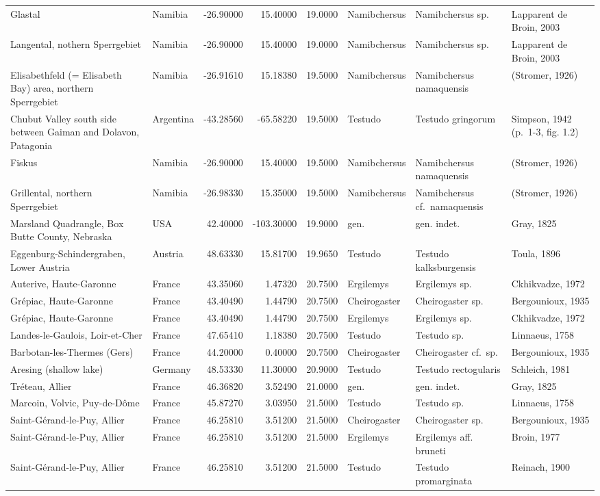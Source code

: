 \documentclass[]{article}
\begin{document}
\begin{longtable}[]{@{}llrrrlll@{}}
Glastal & Namibia & -26.90000 & 15.40000 & 19.0000 & Namibchersus &
Namibchersus sp. & Lapparent de Broin, 2003\tabularnewline
Langental, nothern Sperrgebiet & Namibia & -26.90000 & 15.40000 &
19.0000 & Namibchersus & Namibchersus sp. & Lapparent de Broin,
2003\tabularnewline
Elisabethfeld (= Elisabeth Bay) area, northern Sperrgebiet & Namibia &
-26.91610 & 15.18380 & 19.5000 & Namibchersus & Namibchersus namaquensis
& (Stromer, 1926)\tabularnewline
Chubut Valley south side between Gaiman and Dolavon, Patagonia &
Argentina & -43.28560 & -65.58220 & 19.5000 & Testudo & Testudo
gringorum & Simpson, 1942 (p.~1-3, fig. 1.2)\tabularnewline
Fiskus & Namibia & -26.90000 & 15.40000 & 19.5000 & Namibchersus &
Namibchersus namaquensis & (Stromer, 1926)\tabularnewline
Grillental, northern Sperrgebiet & Namibia & -26.98330 & 15.35000 &
19.5000 & Namibchersus & Namibchersus cf.~namaquensis & (Stromer,
1926)\tabularnewline
Marsland Quadrangle, Box Butte County, Nebraska & USA & 42.40000 &
-103.30000 & 19.9000 & gen. & gen. indet. & Gray, 1825\tabularnewline
Eggenburg-Schindergraben, Lower Austria & Austria & 48.63330 & 15.81700
& 19.9650 & Testudo & Testudo kalksburgensis & Toula,
1896\tabularnewline
Auterive, Haute-Garonne & France & 43.35060 & 1.47320 & 20.7500 &
Ergilemys & Ergilemys sp. & Ckhikvadze, 1972\tabularnewline
Grépiac, Haute-Garonne & France & 43.40490 & 1.44790 & 20.7500 &
Cheirogaster & Cheirogaster sp. & Bergounioux, 1935\tabularnewline
Grépiac, Haute-Garonne & France & 43.40490 & 1.44790 & 20.7500 &
Ergilemys & Ergilemys sp. & Ckhikvadze, 1972\tabularnewline
Landes-le-Gaulois, Loir-et-Cher & France & 47.65410 & 1.18380 & 20.7500
& Testudo & Testudo sp. & Linnaeus, 1758\tabularnewline
Barbotan-les-Thermes (Gers) & France & 44.20000 & 0.40000 & 20.7500 &
Cheirogaster & Cheirogaster cf.~sp. & Bergounioux, 1935\tabularnewline
Aresing (shallow lake) & Germany & 48.53330 & 11.30000 & 20.9000 &
Testudo & Testudo rectogularis & Schleich, 1981\tabularnewline
Tréteau, Allier & France & 46.36820 & 3.52490 & 21.0000 & gen. & gen.
indet. & Gray, 1825\tabularnewline
Marcoin, Volvic, Puy-de-Dôme & France & 45.87270 & 3.03950 & 21.5000 &
Testudo & Testudo sp. & Linnaeus, 1758\tabularnewline
Saint-Gérand-le-Puy, Allier & France & 46.25810 & 3.51200 & 21.5000 &
Cheirogaster & Cheirogaster sp. & Bergounioux, 1935\tabularnewline
Saint-Gérand-le-Puy, Allier & France & 46.25810 & 3.51200 & 21.5000 &
Ergilemys & Ergilemys aff. bruneti & Broin, 1977\tabularnewline
Saint-Gérand-le-Puy, Allier & France & 46.25810 & 3.51200 & 21.5000 &
Testudo & Testudo promarginata & Reinach, 1900\tabularnewline

\end{longtable}
\end{document}
